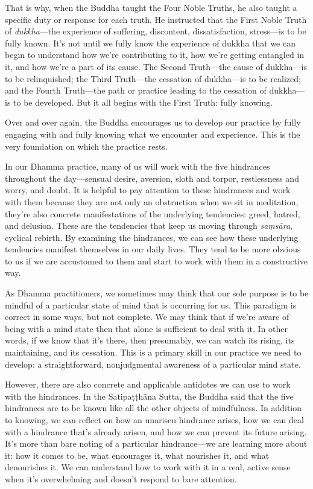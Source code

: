 That is why, when the Buddha taught the Four Noble Truths, he also 
taught a specific duty or response for each truth. He instructed that 
the First Noble Truth of \emph{dukkha}---the experience of suffering, 
discontent, dissatisfaction, stress---is to be fully known. It's not 
until we fully know the experience of dukkha that we can begin to 
understand how we're contributing to it, how we're getting entangled in 
it, and how we're a part of its cause. The Second Truth---the cause of 
dukkha---is to be relinquished; the Third Truth---the cessation of 
dukkha---is to be realized; and the Fourth Truth---the path or practice 
leading to the cessation of dukkha---is to be developed. But it all 
begins with the First Truth: fully knowing.

Over and over again, the Buddha encourages us to develop our practice 
by fully engaging with and fully knowing what we encounter and 
experience. This is the very foundation on which the practice rests.


In our Dhamma practice, many of us will work with the five hindrances 
throughout the day---sensual desire, aversion, sloth and torpor, 
restlessness and worry, and doubt. It is helpful to pay attention to 
these hindrances and work with them because they are not only an 
obstruction when we sit in meditation, they're also concrete 
manifestations of the underlying tendencies: greed, hatred, and 
delusion. These are the tendencies that keep us moving through 
\emph{saṃsāra}, cyclical rebirth. By examining the hindrances, we 
can see how these underlying tendencies manifest themselves in our 
daily lives. They tend to be more obvious to us if we are accustomed to 
them and start to work with them in a constructive way.

As Dhamma practitioners, we sometimes may think that our sole purpose 
is to be mindful of a particular state of mind that is occurring for 
us. This paradigm is correct in some ways, but not complete. We may 
think that if we're aware of being with a mind state then that alone is 
sufficient to deal with it. In other words, if we know that it's there, 
then presumably, we can watch its rising, its maintaining, and its 
cessation. This is a primary skill in our practice we need to develop: 
a straightforward, nonjudgmental awareness of a particular mind state.

However, there are also concrete and applicable antidotes we can use to 
work with the hindrances. In the Satipaṭṭhāna Sutta, the Buddha 
said that the five hindrances are to be known like all the other 
objects of mindfulness. In addition to knowing, we can reflect on how 
an unarisen hindrance arises, how we can deal with a hindrance that's 
already arisen, and how we can prevent its future arising. It's more 
than bare noting of a particular hindrance---we are learning more about 
it: how it comes to be, what encourages it, what nourishes it, and what 
denourishes it. We can understand how to work with it in a real, active 
sense when it's overwhelming and doesn't respond to bare attention.

